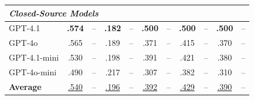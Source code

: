 \begin{tabular}{l|cc|cc|cc|cc|cc}
\midrule
\multicolumn{11}{l}{\textit{Closed-Source Models}} \\
\midrule
GPT-4.1 \citeyearpar{IntroducingGPT41API2024} & \textbf{.574} & -- & \textbf{.182} & -- & \textbf{.500} & -- & \textbf{.500} & -- & \textbf{.500} & -- \\
GPT-4o \citeyearpar{HelloGPT4o2024} & .565 & -- & .189 & -- & .371 & -- & .415 & -- & .370 & -- \\
GPT-4.1-mini \citeyearpar{IntroducingGPT41API2024} & .530 & -- & .198 & -- & .391 & -- & .421 & -- & .380 & -- \\
GPT-4o-mini \citeyearpar{HelloGPT4o2024} & .490 & -- & .217 & -- & .307 & -- & .382 & -- & .310 & -- \\
\midrule
\textbf{Average} & \underline{.540} & -- & \underline{.196} & -- & \underline{.392} & -- & \underline{.429} & -- & \underline{.390} & -- \\
\bottomrule
\end{tabular}
